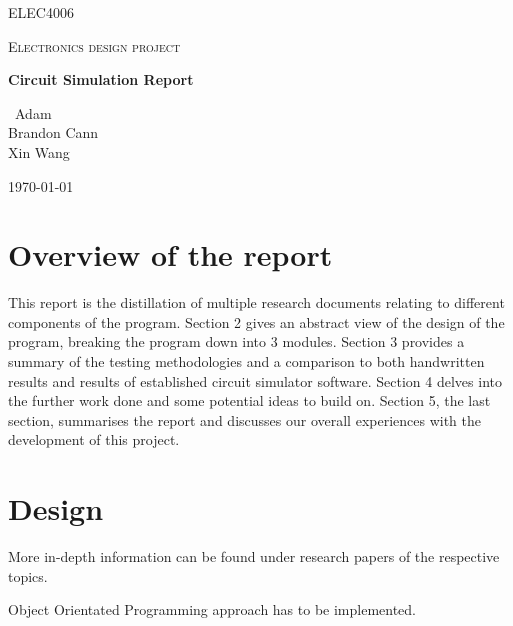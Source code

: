 \documentclass[12pt,a4paper]{article}
\begin{document}
\begin{titlepage}
	\centering
	{\scshape\LARGE ELEC4006 \par}
	\vspace{1cm}
	{\scshape\Large Electronics design project\par}
	\vspace{1.5cm}
	{\huge\bfseries Circuit Simulation Report\par}
	\vspace{2cm}
	{\Large\ Adam\\ Brandon Cann\\ Xin Wang \par}
	\vfill
	{\large \today\par}
\end{titlepage}

\tableofcontents
\pagebreak

\begin{abstract}
This report describes the design and implementation of a program that is capable of performing a transient simulation
by calculating the node voltages at each successive instant in time. This program parses the netlist file
into a graph data structure, performs analysis using conductance matrices and outputs the results in a CSV format.

-- How accurate is it?
\par
-- Comaparison to commercial software?
\end{abstract}
\pagebreak
\section{Overview of the report}
This report is the distillation of multiple research documents relating to different components of the program.
Section 2 gives an abstract view of the design of the program, breaking the program down into 3 modules.
Section 3 provides a summary of the testing methodologies and a comparison to both handwritten results and results of 
established circuit simulator software. 
Section 4 delves into the further work done and some potential ideas to build on.
Section 5, the last section, summarises the report and discusses our overall experiences with the development of this project.

\section{Design}
More in-depth information can be found under research papers of the respective topics.
\par
Object Orientated Programming approach has to be implemented.
\end{document}
